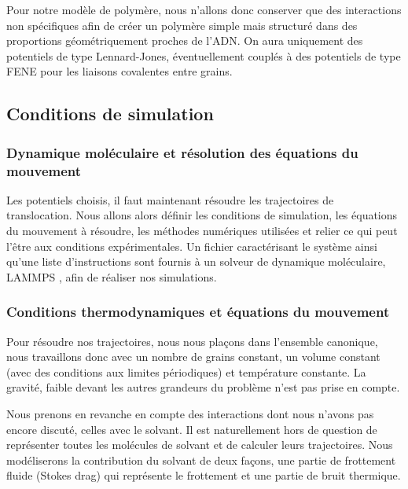 Pour notre modèle de polymère, nous n'allons donc conserver que des interactions non spécifiques afin de créer un polymère simple mais structuré dans des proportions géométriquement proches de l'ADN. On aura uniquement des potentiels de type Lennard-Jones, éventuellement couplés à des potentiels de type FENE pour les liaisons covalentes entre grains.

\subsection{Conditions de simulation}

\subsubsection{Dynamique moléculaire et résolution des équations du mouvement}

Les potentiels choisis, il faut maintenant résoudre les trajectoires de translocation. Nous allons alors définir les conditions de simulation, les équations du mouvement à résoudre, les méthodes numériques utilisées et relier ce qui peut l'être aux conditions expérimentales.
Un fichier caractérisant le système ainsi qu'une liste d'instructions sont fournis à un solveur de dynamique moléculaire, LAMMPS \cite{lammps}, afin de réaliser nos simulations.

\subsubsection{Conditions thermodynamiques et équations du mouvement}



Pour résoudre nos trajectoires, nous nous plaçons dans l'ensemble canonique, nous travaillons donc avec un nombre de grains constant, un volume constant (avec des conditions aux limites périodiques) et température constante. La gravité, faible devant les autres grandeurs du problème n'est pas prise en compte.


Nous prenons en revanche en compte des interactions dont nous n'avons pas encore discuté, celles avec le solvant. Il est naturellement hors de question de représenter toutes les molécules de solvant et de calculer leurs trajectoires. Nous modéliserons la contribution du solvant de deux façons, une partie de frottement fluide (Stokes drag) qui représente le frottement et une partie de bruit thermique. 



